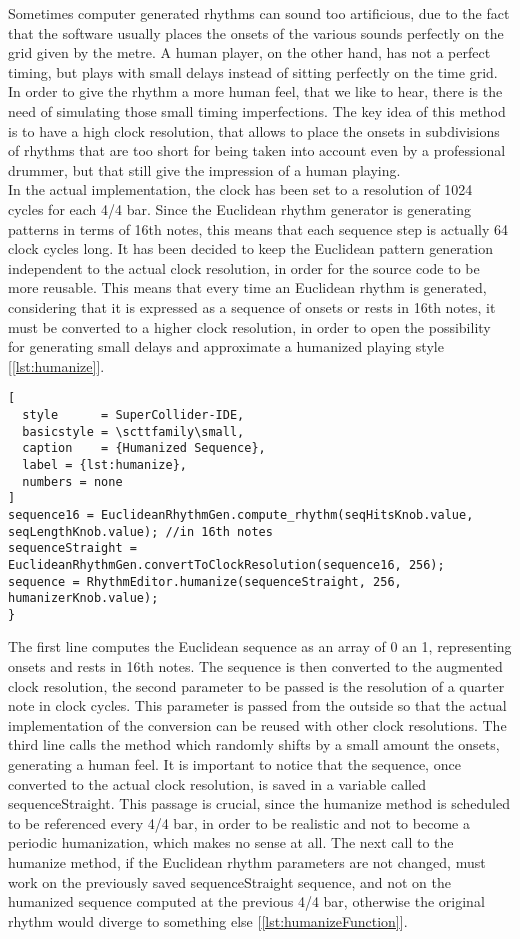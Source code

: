 \documentclass[main.tex]{subfiles}
\begin{document}
Sometimes computer generated rhythms can sound too artificious, due to the fact that the software usually places the onsets of the various sounds perfectly on the grid given by the metre. A human player, on the other hand, has not a perfect timing, but plays with small delays instead of sitting perfectly on the time grid. In order to give the rhythm a more human feel, that we like to hear, there is the need of simulating those small timing imperfections.
The key idea of this method is to have a high clock resolution, that allows to place the onsets in subdivisions of rhythms that are too short for being taken into account even by a professional drummer, but that still give the impression of a human playing.\\
In the actual implementation, the clock has been set to a resolution of 1024 cycles for each 4/4 bar. Since the Euclidean rhythm generator is generating patterns in terms of 16th notes, this means that each sequence step is actually 64 clock cycles long. It has been decided to keep the Euclidean pattern generation independent to the actual clock resolution, in order for the source code to be more reusable. This means that every time an Euclidean rhythm is generated, considering that it is expressed as a sequence of onsets or rests in 16th notes, it must be converted to a higher clock resolution, in order to open the possibility for generating small delays and approximate a humanized playing style [\autoref{lst:humanize}].

\begin{lstlisting}[
  style      = SuperCollider-IDE,
  basicstyle = \scttfamily\small,
  caption    = {Humanized Sequence},
  label = {lst:humanize},
  numbers = none
]
sequence16 = EuclideanRhythmGen.compute_rhythm(seqHitsKnob.value, seqLengthKnob.value); //in 16th notes
sequenceStraight = EuclideanRhythmGen.convertToClockResolution(sequence16, 256);
sequence = RhythmEditor.humanize(sequenceStraight, 256, humanizerKnob.value);
}
\end{lstlisting} 
The first line computes the Euclidean sequence as an array of 0 an 1, representing onsets and rests in 16th notes. The sequence is then converted to the augmented clock resolution, the second parameter to be passed is the resolution of a quarter note in clock cycles. This parameter is passed from the outside so that the actual implementation of the conversion can be reused with other clock resolutions. The third line calls the method which randomly shifts by a small amount the onsets, generating a human feel. It is important to notice that the sequence, once converted to the actual clock resolution, is saved in a variable called sequenceStraight. This passage is crucial, since the humanize method is scheduled to be referenced every 4/4 bar, in order to be realistic and not to become a periodic humanization, which makes no sense at all. The next call to the humanize method, if the Euclidean rhythm parameters are not changed, must work on the previously saved sequenceStraight sequence, and not on the humanized sequence computed at the previous 4/4 bar, otherwise the original rhythm would diverge to something else [\autoref{lst:humanizeFunction}].\\
\end{document}
